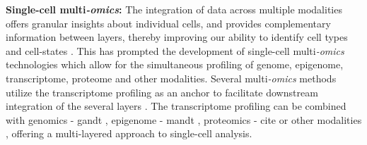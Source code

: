 \textbf{Single-cell multi\textit{-omics}: }The integration of data across multiple modalities offers granular insights about individual cells, and provides complementary information between layers, thereby improving our ability to identify cell types and cell-states \textbf{\cite{flynn_single-cell_2023}}. This has prompted the development of single-cell multi\textit{-omics} technologies which allow for the simultaneous profiling of genome, epigenome, transcriptome, proteome and other modalities. Several multi\textit{-omics} methods utilize the transcriptome profiling as an anchor to facilitate downstream integration of the several layers \textbf{\cite{baysoy_technological_2023}}. The transcriptome profiling can be combined with genomics - \gls{gandt} \textbf{\cite{macaulay_gt-seq_2015}}, epigenome - \gls{mandt} \textbf{\cite{angermueller_parallel_2016}}, proteomics - \gls{cite} \textbf{\cite{stoeckius_simultaneous_2017}} or other modalities \textbf{\cite{dixit_perturb-seq_2016,singh_high-throughput_2019}}, offering a multi-layered approach to single-cell analysis.\\



